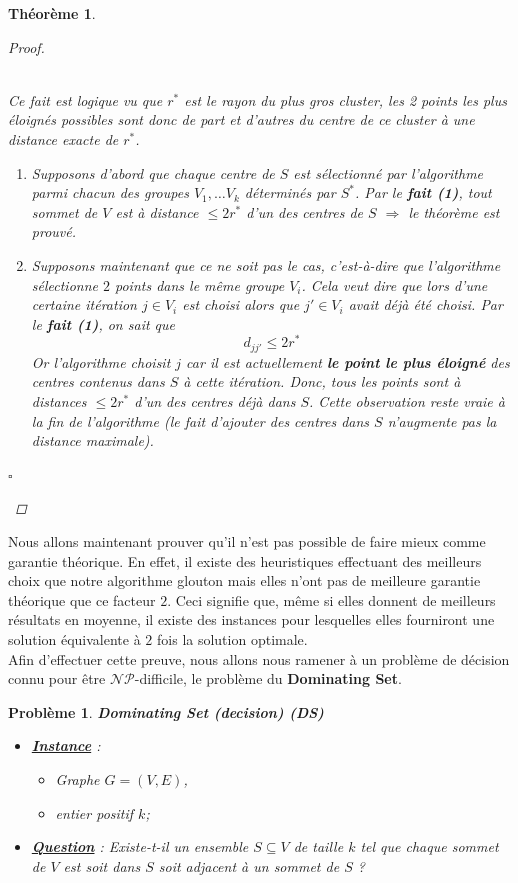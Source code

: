 \documentclass{article}
\newcommand{\titre}[1]{\textcolor{title}{#1}}
\newcommand{\cqfd}{\begin{flushright}$\square$\end{flushright}}
\newtheorem{thm}{Th\'eor\`eme}[section]
\newtheorem{pbm}{Problème}[section]
\newtheorem{proof}{Preuve}[section]
\newenvironment{pblm}{\hbox{\raisebox{0.4em}{\vrule depth 1pt height 0.4pt width 5cm}}\begin{pbm}}
{\end{pbm}\hbox{\raisebox{0.4em}{\vrule depth 1pt height 0.4pt width 5cm}}}
\begin{document}
\begin{sffamily}
\begin{thm}
\begin{proof}
\begin{itemize}
$ $\\Ce fait est logique vu que $r^*$ est le rayon du plus gros cluster, les 2 points les plus éloignés possibles sont donc de part et
d'autres  du centre de ce cluster à une distance exacte de $r^*$.
\begin{enumerate}
\item Supposons d'abord que chaque centre de $S$ est sélectionné par l'algorithme parmi chacun des groupes $V_1,\ldots V_k$ déterminés
par $S^*$. Par le \textbf{fait (1)}, tout sommet de $V$ est à distance $\leq 2r^*$ d'un des centres de $S$ $\Rightarrow$ le théorème est
prouvé.
\item Supposons maintenant que ce ne soit pas le cas, c'est-à-dire que l'algorithme sélectionne $2$ points dans le même groupe $V_i$.
Cela veut dire que lors d'une certaine itération $j\in V_i$ est choisi alors que $j'\in V_i$ avait déjà été choisi. Par le \textbf{fait
(1)}, on sait que $$d_{jj'} \leq 2r^*$$
Or l'algorithme choisit $j$ car il est actuellement \textbf{le point le plus éloigné} des centres contenus dans $S$ à cette itération.
Donc, tous les points sont à distances $\leq 2r^*$ d'un des centres déjà dans $S$. Cette observation reste vraie à la fin de l'algorithme
(le fait d'ajouter des centres dans $S$ n'augmente pas la distance maximale).
\end{enumerate}
\end{itemize}
\cqfd
\end{proof}
\end{thm}

Nous allons maintenant prouver qu'il n'est pas possible de faire mieux comme garantie théorique. En effet, il existe des heuristiques
effectuant des meilleurs choix que notre algorithme glouton mais elles n'ont pas de meilleure garantie théorique que ce facteur $2$. Ceci
signifie que, même si elles donnent de meilleurs résultats en moyenne, il existe des instances pour lesquelles elles fourniront une
solution équivalente à $2$ fois la solution optimale. \\
Afin d'effectuer cette preuve, nous allons nous ramener à un problème de décision connu pour être $\mathcal{NP}$-difficile, le problème
du \textbf{Dominating Set}.

\begin{pblm}
\textbf{Dominating Set (decision) (\titre{DS})}
\begin{itemize}
\item[*]\textbf{\underline{Instance}} :
\begin{itemize}
\item Graphe $G=(V,E)$,
\item entier positif $k$;
\end{itemize}
\item[*]\textbf{\underline{Question}} : Existe-t-il un ensemble $S\subseteq V$ de taille $k$ tel que chaque sommet de $V$ est soit dans
$S$ soit adjacent à un sommet de $S$ ?
\end{itemize}
\end{pblm}


\end{sffamily}
\end{document}
